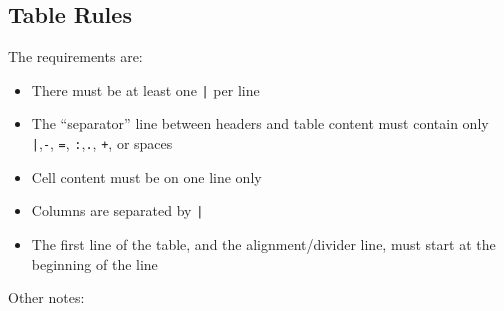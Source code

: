 \subsection{Table Rules}
\label{tablerules}

The requirements are:

\begin{itemize}
\item There must be at least one \texttt{|} per line

\item The ``separator'' line between headers and table content must contain only \texttt{|},\texttt{-}, \texttt{=}, \texttt{:},\texttt{.}, \texttt{+}, or spaces

\item Cell content must be on one line only

\item Columns are separated by \texttt{|}

\item The first line of the table, and the alignment\slash{}divider line, must start at
the beginning of the line

\end{itemize}

Other notes:

